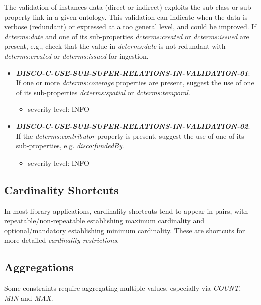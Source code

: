\documentclass{llncs}
\begin{document}
The validation of instances data (direct or indirect) exploits the sub-class or sub-property link in a given ontology.
This validation can indicate when the data is verbose (redundant) or expressed at a too general level, and could be improved.
If \emph{dcterms:date} and one of its sub-properties \emph{dcterms:created} or \emph{dcterms:issued} are present, e.g., check that the value in \emph{dcterms:date} is not redundant with \emph{dcterms:created} or \emph{dcterms:issued} for ingestion.

\begin{itemize}
	\item \textbf{{\em DISCO-C-USE-SUB-SUPER-RELATIONS-IN-VALIDATION-01}}: 
	If one or more \emph{dcterms:coverage} properties are present, suggest the use of one of its sub-properties \emph{dcterms:spatial} or \emph{dcterms:temporal}.
		\begin{itemize}
		\item severity level: INFO
	\end{itemize}
	\item \textbf{{\em DISCO-C-USE-SUB-SUPER-RELATIONS-IN-VALIDATION-02}}: 
	If the \emph{dcterms:contributor} property is present, suggest the use of one of its sub-properties, e.g. \emph{disco:fundedBy}.
		\begin{itemize}
		\item severity level: INFO
	\end{itemize}
\end{itemize}

\subsection{Cardinality Shortcuts}

In most library applications, cardinality shortcuts tend to appear in pairs, with repeatable/non-repeatable establishing maximum cardinality and optional/mandatory establishing minimum cardinality.
These are shortcuts for more detailed \emph{cardinality restrictions}.

\subsection{Aggregations}

Some constraints require aggregating multiple values, especially via \emph{COUNT}, \emph{MIN} and \emph{MAX}.
\end{document}
